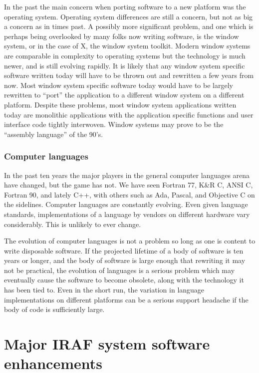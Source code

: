 In the past the main concern when porting software to a new platform was the
operating system.  Operating system differences are still a concern, but not
as big a concern as in times past.  A possibly more significant problem, and
one which is perhaps being overlooked by many folks now writing software, is
the window system, or in the case of X, the window system toolkit.  Modern
window systems are comparable in complexity to operating systems but the
technology is much newer, and is still evolving rapidly.  It is likely that
any window system specific software written today will have to be thrown out
and rewritten a few years from now.  Most window system specific software
today would have to be largely rewritten to ``port'' the application to a
different window system on a different platform.  Despite these problems,
most window system applications written today are monolithic applications
with the application specific functions and user interface code tightly
interwoven.  Window systems may prove to be the ``assembly language'' of the
90's.

\subsubsection {Computer languages}

In the past ten years the major players in the general computer languages
arena have changed, but the game has not.  We have seen Fortran 77, K\&R C,
ANSI C, Fortran 90, and lately C++, with others such as Ada, Pascal, and
Objective C on the sidelines.  Computer languages are constantly evolving.
Even given language standards, implementations of a language by vendors on
different hardware vary considerably.  This is unlikely to ever change.

The evolution of computer languages is not a problem so long as one is
content to write disposable software.  If the projected lifetime of a body
of software is ten years or longer, and the body of software is large enough
that rewriting it may not be practical, the evolution of languages is a
serious problem which may eventually cause the software to become obsolete,
along with the technology it has been tied to.  Even in the short run, the
variation in language implementations on different platforms can be a
serious support headache if the body of code is sufficiently large.

\section {Major IRAF system software enhancements}

